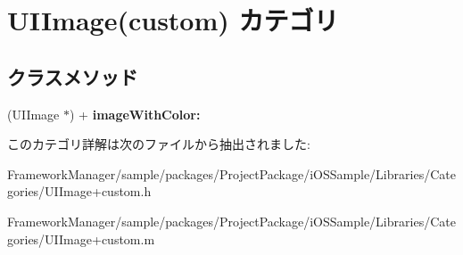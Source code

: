 \hypertarget{category_u_i_image_07custom_08}{}\section{U\+I\+Image(custom) カテゴリ}
\label{category_u_i_image_07custom_08}
\subsection*{クラスメソッド}
\begin{DoxyCompactItemize}
\item 
\hypertarget{category_u_i_image_07custom_08_a70b75871bd4202ee740a94fb2d78dad6}{}(U\+I\+Image $\ast$) + {\bfseries image\+With\+Color\+:}\label{category_u_i_image_07custom_08_a70b75871bd4202ee740a94fb2d78dad6}

\end{DoxyCompactItemize}


このカテゴリ詳解は次のファイルから抽出されました\+:\begin{DoxyCompactItemize}
\item 
Framework\+Manager/sample/packages/\+Project\+Package/i\+O\+S\+Sample/\+Libraries/\+Categories/U\+I\+Image+custom.\+h\item 
Framework\+Manager/sample/packages/\+Project\+Package/i\+O\+S\+Sample/\+Libraries/\+Categories/U\+I\+Image+custom.\+m\end{DoxyCompactItemize}

